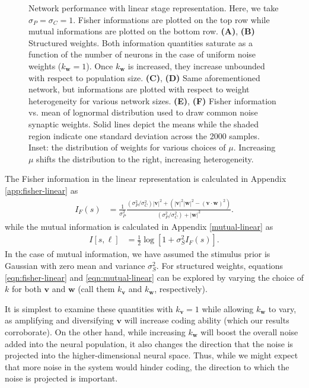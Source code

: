\documentclass[12pt]{article}
\begin{document}
\begin{figure}[h]
	\caption{Network performance with linear stage representation. Here, we take $\sigma_P = \sigma_C=1$. Fisher informations are plotted on the top row while mutual informations are plotted on the bottom row. \textbf{(A)}, \textbf{(B)} Structured weights. Both information quantities saturate as a function of the number of neurons in the case of uniform noise weights ($k_{\mathbf{w}}=1$). Once $k_{\mathbf{w}}$ is increased, they increase unbounded with respect to population size. \textbf{(C)}, \textbf{(D)} Same aforementioned network, but informations are plotted with respect to weight heterogeneity for various network sizes. \textbf{(E)}, \textbf{(F)} Fisher information vs. mean of lognormal distribution used to draw common noise synaptic weights.  Solid lines depict the means while the shaded region indicate one standard deviation across the 2000 samples. Inset: the distribution of weights for various choices of $\mu$. Increasing $\mu$ shifts the distribution to the right, increasing heterogeneity.}\label{fig:struct-linear}
\end{figure}
	
The Fisher information in the linear representation is calculated in Appendix \ref{app:fisher-linear} as 
\begin{align}
	I_F(s) &= \frac{1}{\sigma_P^2}\frac{\left(\sigma_P^2/\sigma_C^2\right) |\mathbf{v}|^2 +  \left(|\mathbf{v}|^2|\mathbf{w}|^2 - (\mathbf{v}\cdot\mathbf{w})^2\right)}{(\sigma_P^2/\sigma_C^2)+ |\mathbf{w}|^2}. \label{eqn:fisher-linear}
\end{align}
while the mutual information is calculated in Appendix \ref{mutual-linear} as
\begin{align}
	I[s, \boldsymbol{\ell}] &= \frac{1}{2} \log \left[1 + \sigma_S^2 I_F(s)\right]. \label{eqn:mutual-linear}
\end{align}
In the case of mutual information, we have assumed the stimulus prior is Gaussian with zero mean and variance $\sigma_S^2$. For structured weights, equations \ref{eqn:fisher-linear} and \ref{eqn:mutual-linear} can be explored by varying the choice of $k$ for both $\mathbf{v}$ and $\mathbf{w}$ (call them $k_{\mathbf{v}}$ and $k_{\mathbf{w}}$, respectively).
	
It is simplest to examine these quantities with $k_{\mathbf{v}}=1$ while allowing $k_{\mathbf{w}}$ to vary, as amplifying and diversifying $\mathbf{v}$ will increase coding ability (which our results corroborate). On the other hand, while increasing $k_{\mathbf{w}}$ will boost the overall noise added into the neural population, it also changes the direction that the noise is projected into the higher-dimensional neural space. Thus, while we might expect that more noise in the system would hinder coding, the direction to which the noise is projected is important. 
	
\end{document}
